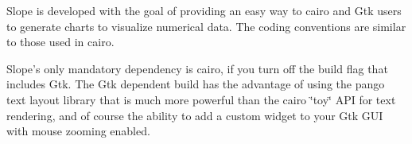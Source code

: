Slope is developed with the goal of providing an easy way to cairo and Gtk users to generate charts to visualize numerical data. The coding conventions are similar to those used in cairo.

Slope's only mandatory dependency is cairo, if you turn off the build flag that includes Gtk. The Gtk dependent build has the advantage of using the pango text layout library that is much more powerful than the cairo \char`\"{}toy\char`\"{} A\+P\+I for text rendering, and of course the ability to add a custom widget to your Gtk G\+U\+I with mouse zooming enabled. 